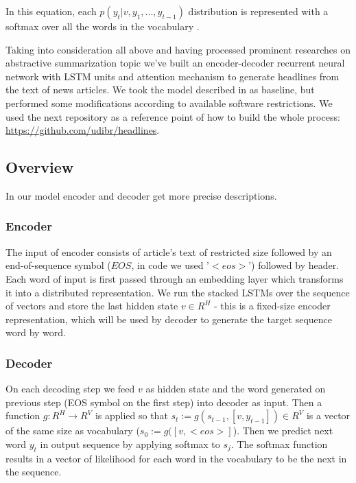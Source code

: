 In this equation, each $p(y_t|v, y_1, ..., y_{t-1})$ distribution is represented with a softmax over all the
words in the vocabulary \cite{seq2seq_with_NN}.

Taking into consideration all above and having processed prominent researches on abstractive summarization topic we've built an encoder-decoder recurrent neural network with LSTM units and attention mechanism to generate headlines from the text of news articles. We took the model described in \cite{model-baseline-article} as baseline, but performed some modifications according to available software restrictions. We used the next repository as a reference point of how to build the whole process: \url{https://github.com/udibr/headlines}.

\subsection{Overview}
In our model encoder and decoder get more precise descriptions.


\subsubsection{Encoder}
The input of encoder consists of article's text of restricted size followed by an end-of-sequence symbol ($EOS$, in code we used '$<eos>$') followed by header. Each word of input is first passed through an embedding layer which transforms it into a distributed representation.
We run the stacked LSTMs over the sequence of vectors and store the last hidden state $v \in R^H$ - this is a fixed-size encoder representation, which will be used by decoder to generate the target sequence word by word.   


\subsubsection{Decoder}
On each decoding step we feed $v$ as hidden state and the word generated on previous step (EOS symbol on the first step) into decoder as input.
Then a function $g: R^H \rightarrow R^V$ is applied so that $s_t := g(s_{t-1}, [v, y_{t-1}]) \in R^V$ is a vector of the same size as vocabulary ($s_0 := g([v, <eos>]$). Then we predict next word $y_t$ in output sequence by applying softmax to $s_j$. The softmax function results in a vector of likelihood for each word in the vocabulary to be the next in the sequence. 

